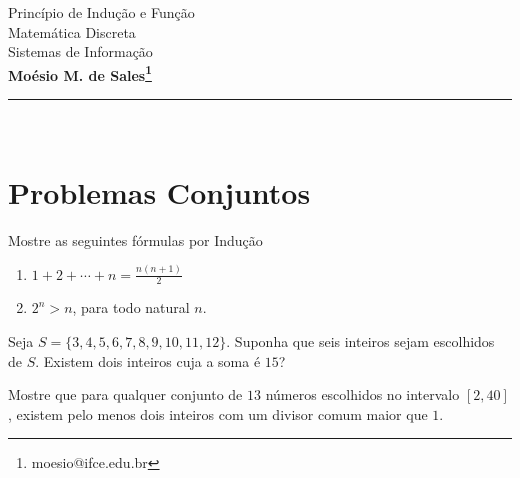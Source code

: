 \documentclass[11pt,a4paper]{article}
\makeatletter
\newcommand{\nome}{\bf Moésio M. de Sales\footnote{moesio@ifce.edu.br}}
\newcommand{\titu}{ Princípio de Indução e Função}
\newcommand{\disc}{Matemática Discreta}
\newcommand{\curso}{Sistemas de Informação}
\makeatother
\begin{document}
{\Large
\begin{center} \titu\\ \disc\\ \curso \\  \nome\end{center}
}
\hfill   %
\hrule\ 


\section{\sc Problemas Conjuntos}


{\exe 
		Mostre as seguintes fórmulas por Indução\cite{gersting2004fundamentos,demidovitch1965problems}
\begin{enumerate}
\item $
1+2+\cdots + n =\frac{n(n+1)}{2}
$
\item $2^n>n$, para todo natural $n$.
\end{enumerate}
}



\bexer







\item  Seja $S= \{3,4,5,6,7,8,9,10,11,12\}$. Suponha que seis inteiros sejam escolhidos de $S$. Existem dois inteiros cuja a soma é $15$?
\item  Mostre que para qualquer conjunto de $13$ números escolhidos no intervalo  $[2, 40]$,  existem pelo menos dois inteiros com um divisor comum maior que $1$. 
\end{document}
